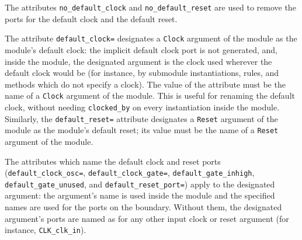 \documentclass[twoside,letterpaper]{article}
\newcommand{\te}[1]{\texttt{#1}}
\begin{document}
The attributes \te{no\_default\_clock} and
\te{no\_default\_reset} are used to remove the ports for   the default
clock  and  the
default reset.

The attribute \te{default\_clock=} designates a \te{Clock} argument of
the module as the module's default clock: the implicit default clock
port is not generated, and, inside the module, the designated argument
is the clock used wherever the default clock would be (for instance, by
submodule instantiations, rules, and methods which do not specify a
clock).  The value of the attribute must be the name of a \te{Clock}
argument of the module.  This is useful for renaming the default clock,
without needing \te{clocked\_by} on every instantiation inside the
module.  Similarly, the \te{default\_reset=} attribute designates a
\te{Reset} argument of the module as the module's default reset; its
value must be the name of a \te{Reset} argument of the module.

The attributes which name the default clock and reset ports
(\te{default\_clock\_osc=}, \te{default\_clock\_gate=},
\te{default\_gate\_inhigh}, \te{default\_gate\_unused}, and
\te{default\_reset\_port=}) apply to the designated argument: the
argument's name is used inside the module and the specified names are
used for the ports on the boundary.  Without them, the designated
argument's ports are named as for any other input clock or reset
argument (for instance, \te{CLK\_clk\_in}).



\end{document}
